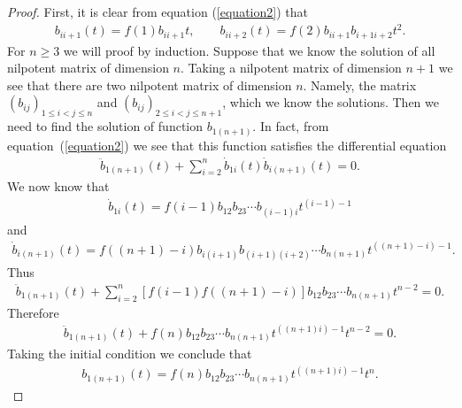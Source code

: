 \documentclass[10pt,a4paper]{amsart}
\numberwithin{equation}{section}
\begin{document}
\begin{proof}
  First, it is clear from equation (\ref{equation2}) that
  \begin{gather*}
    b_{ii+1}(t)   =   f(1)b_{ii+1}t, \qquad
    b_{ii+2}(t)   =   f(2)b_{ii+1}b_{i+1i+2}t^2.
  \end{gather*}
  For $n\geq 3$ we will proof by induction. Suppose that we know the solution of all nilpotent matrix of dimension $n$. Taking a nilpotent matrix of dimension  $n+1$ we see that there are two nilpotent matrix of dimension $n$. Namely, the matrix $(b_{ij})_{1\leq i< j\leq n}$ and $(b_{ij})_{2\leq i< j\leq n+1}$, which we know the solutions. Then we need to f\/ind the solution of function $b_{1(n+1)}$. In fact, from equation~(\ref{equation2}) we see that this function satisf\/ies the  dif\/ferential equation
  \begin{gather*}
    \ddot{b}_{1(n+1)}(t) + \sum_{i=2}^{n} \dot{b}_{1i}(t)\dot{b}_{i(n+1)}(t) = 0.
  \end{gather*}
  We now know that
  \begin{gather*}
    \dot{b}_{1i}(t) = f(i-1)b_{12}b_{23} \cdots b_{(i-1)i}t^{(i-1)-1}
  \end{gather*}
  and
  \begin{gather*}
    \dot{b}_{i(n+1)}(t) = f((n+1)-i)b_{i(i+1)}b_{(i+1)(i+2)} \cdots b_{n(n+1)}t^{((n+1)-i)-1}.
  \end{gather*}
  Thus
  \begin{gather*}
    \ddot{b}_{1(n+1)}(t) + \sum_{i=2}^{n}[f(i-1)f((n+1)-i)]b_{12}b_{23}  \cdots b_{n(n+1)} t^{n-2}   =   0.
  \end{gather*}
  Therefore
  \begin{gather*}
    \ddot{b}_{1(n+1)}(t) + f(n)b_{12}b_{23}  \cdots b_{n(n+1)}t^{((n+1)i)-1} t^{n-2}  =  0.
  \end{gather*}
  Taking the initial condition we conclude that
  \begin{gather*}
    b_{1(n+1)}(t)=f(n)b_{12}b_{23} \cdots b_{n(n+1)}t^{((n+1)i)-1} t^{n}.\tag*{\qed}
  \end{gather*}
  \renewcommand{\qed}{}
\end{proof}
\end{document}

